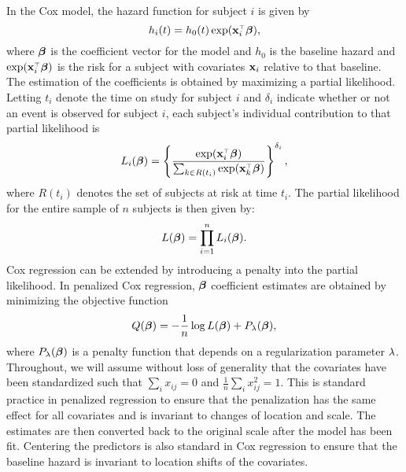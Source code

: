 In the Cox model, the hazard function for subject $i$ is given by 
\begin{equation*}
  h_{i}(t) = h_{0}(t) \exp( \mathbf{x}_i^{\scriptscriptstyle\top}\boldsymbol{\beta}),
\end{equation*} 
where $\boldsymbol{\beta}$ is the coefficient vector for the model and $h_{0}$ is the baseline hazard and $\exp(\mathbf{x}_i^{\scriptscriptstyle\top}\boldsymbol{\beta})$ is the risk for a subject with covariates $\mathbf{x}_i$ relative to that baseline.  The estimation of the coefficients is obtained by maximizing a partial likelihood.  Letting $t_i$ denote the time on study for subject $i$ and $\delta_{i}$ indicate whether or not an event is observed for subject $i$, each subject's individual contribution to that partial likelihood is
\begin{equation}
  \label{eq:cox-pl-subj}
  L_{i}(\boldsymbol{\beta}) = \left \{\frac{\exp ( \mathbf{x}_i^{\scriptscriptstyle\top}\boldsymbol{\beta})}{\sum_{ k \in R(t_{i})}\exp (\mathbf{x}_k ^{\scriptscriptstyle\top} \boldsymbol{\beta})}\right \}^{\delta_{i}},
\end{equation}
where $R(t_{i})$ denotes the set of subjects at risk at time $t_{i}$.  The partial likelihood for the entire sample of $n$ subjects is then given by:
\begin{equation}
  \label{eq:cox-pl-sum}
  L(\boldsymbol{\beta}) =\prod_{i = 1}^{n} L_{i}(\boldsymbol{\beta}).
\end{equation}
Cox regression can be extended by introducing a penalty into the partial likelihood.  In penalized Cox regression, $\boldsymbol{\beta}$ coefficient estimates are obtained by minimizing the objective function
\begin{equation}
  \label{eq:obj}
  Q(\boldsymbol{\beta}) = - \frac{1}{n} \log L(\boldsymbol{\beta}) + P_{\lambda}(\boldsymbol{\beta}),
\end{equation}
where $P_{\lambda}(\boldsymbol{\beta})$ is a penalty function that depends on a regularization parameter $\lambda$.  Throughout, we will assume without loss of generality that the covariates have been standardized such that $\sum_i x_{ij} = 0$ and $\tfrac{1}{n}\sum_i x_{ij}^2=1$.  This is standard practice in penalized regression to ensure that the penalization has the same effect for all covariates and is invariant to changes of location and scale.  The estimates are then converted back to the original scale after the model has been fit.  Centering the predictors is also standard in Cox regression to ensure that the baseline hazard is invariant to location shifts of the covariates.

